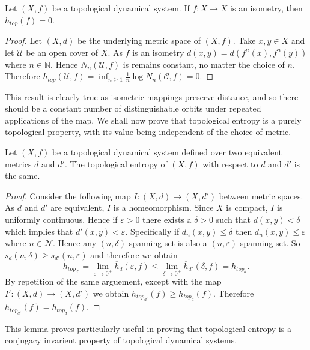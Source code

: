 \begin{prop} \label{prop:isometry-entropy}
    Let $(X, f)$ be a topological dynamical system. If $f: X \to X$ is an isometry, then $h_{top}(f) = 0$.
    \begin{proof}
        Let $(X, d)$ be the underlying metric space of $(X, f)$. Take $x, y \in X$ and let $\mathcal{U}$ be an open cover of $X$. As $f$ is an isometry $d(x, y) = d(f^n(x), f^n(y))$ where $n \in \mathbb{N}$. Hence $N_n(\mathcal{U}, f)$ is remains constant, no matter the choice of $n$. Therefore $h_{top}(\mathcal{U}, f) = \inf_{n \geq 1} \frac{1}{n}\log{N_n(\mathcal{C}, f)} = 0$.
    \end{proof}
\end{prop}

This result is clearly true as isometric mappings preserve distance, and so there should be a constant number of distinguishable orbits under repeated applications of the map. We shall now prove that topological entropy is a purely topological property, with its value being independent of the choice of metric.

\begin{lem} \label{lem:entropy-independent-of-metric}
    Let $(X, f)$ be a topological dynamical system defined over two equivalent metrics $d$ and $d'$. The topological entropy of $(X, f)$ with respect to $d$ and $d'$ is the same.
    \begin{proof}
        Consider the following map  $I: (X, d) \to (X, d')$ between metric spaces. As $d$ and $d'$ are equivalent, $I$ is a homeomorphism. Since $X$ is compact, $I$ is uniformly continuous. Hence if $\varepsilon > 0$ there exists a $\delta > 0$ such that $d(x, y) < \delta$ which implies that $d'(x, y) < \varepsilon$. Specifically if $d_n(x, y) \leq \delta$ then $d_n(x, y) \leq \varepsilon$ where $n \in \mathcal{N}$. Hence any $(n, \delta)$-spanning set is also a $(n, \varepsilon)$-spanning set. So $s_d(n, \delta) \geq s_{d'}(n, \varepsilon)$ and therefore we obtain  \[h_{top_{d'}} = \lim_{\varepsilon \to 0^+}{\overline{h}_d(\varepsilon, f)} \leq \lim_{\delta \to 0^+}{\overline{h}_{d'}(\delta, f)} = h_{top_d}.\] By repetition of the same arguement, except with the map $I': (X, d) \to (X, d')$ we obtain $h_{top_{d'}}(f) \geq h_{top_d}(f)$. Therefore $h_{top_{d'}}(f) = h_{top_d}(f)$.
    \end{proof}
\end{lem}

This lemma proves particularly useful in proving that topological entropy is a conjugacy invarient property of topological dynamical systems.

